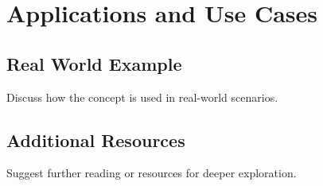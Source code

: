 \section{Applications and Use Cases}
\subsection*{Real World Example}
Discuss how the concept is used in real-world scenarios.
\subsection*{Additional Resources}
Suggest further reading or resources for deeper exploration.